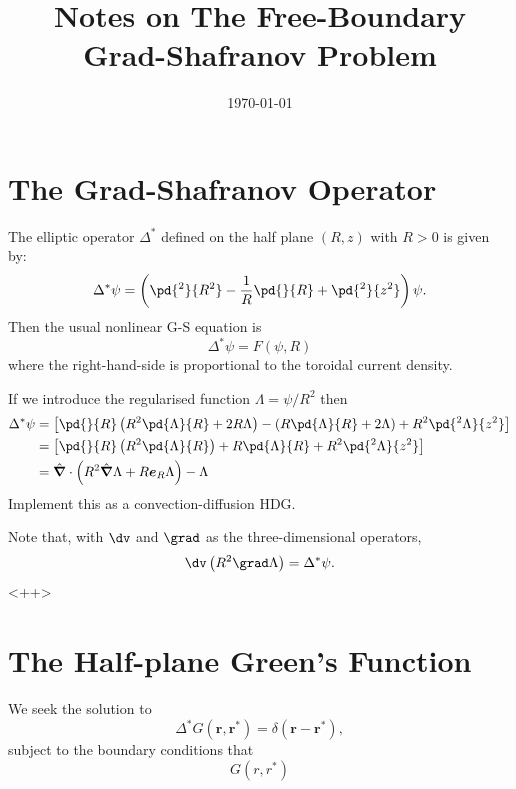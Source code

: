 \documentclass{jpp}
\begin{document}
\date{\today}

\title{Notes on The Free-Boundary Grad-Shafranov Problem}
\author{\ianabel}


\maketitle
\section{The Grad-Shafranov Operator}
The elliptic operator $\Delta^*$ defined on the half plane $(R,z)$ with $R>0$ is given by:
\begin{equation}
\Delta^* \psi = \left( \pd{^2}{ R^2} - \frac{1}{R}\pd{ }{R} + \pd{^2}{z^2} \right)\psi.
\end{equation}
Then the usual nonlinear G-S equation is
\begin{equation}
\Delta^*\psi = F(\psi,R)
\end{equation}
where the right-hand-side is proportional to the toroidal current density.

If we introduce the regularised function $\Lambda = \psi/R^2$ then
\begin{equation}
\begin{split}
\Delta^* \psi &= \left[ \pd{ }{R} \left( R^2\pd{\Lambda}{R} + 2 R \Lambda \right) - \left( R\pd{\Lambda}{R} + 2 \Lambda \right) + R^2 \pd{^2\Lambda}{z^2} \right]\\
&= \left[ \pd{ }{R} \left( R^2\pd{\Lambda}{R} \right) + R \pd{\Lambda}{R} + R^2 \pd{^2\Lambda}{z^2} \right] \\
&=  \hat{\bm{\nabla}} \cdot \left( R^2 \hat{\bm{\nabla}} \Lambda + R \bm{e}_{R} \Lambda \right) - \Lambda
\end{split}
\end{equation}
Implement this as a convection-diffusion HDG.

Note that, with $\dv$ and $\grad$ as the three-dimensional operators,
\begin{equation}
\dv \left( R^2 \grad \Lambda \right) = \Delta^* \psi.
\label{<++>}
\end{equation}<++>

\section{The Half-plane Green's Function}
We seek the solution to 
\begin{equation}
\Delta^* G(\bm{r},\bm{r}^*) = \delta\left( \bm{r} - \bm{r}^* \right),
\end{equation}
subject to the boundary conditions that
\begin{equation}
G(r,r^*)
\end{equation}
\end{document}
